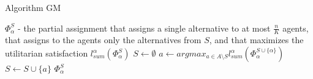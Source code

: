 \begin{algorithm}
\caption{Algorithm GM}\label{euclid}
\begin{algorithmic}[1]
		\State $\Phi^{S}_{\alpha}$ - the partial assignment that assigns a single alternative to at most $\frac{n}{K}$ agents, that assigns to the agents only the alternatives from $S$, and that maximizes the utilitarian satisfaction $l^{\alpha}_{sum}(\Phi^{S}_{\alpha})$
		\State $S \gets \emptyset$
			\State $a \gets argmax_{a \in A \setminus S} l^{\alpha}_{sum} (\Phi^{S \cup \{\alpha\}}_{\alpha})$
			\State $S \gets S \cup \{a\}$
		\EndFor
		\State \Return $\Phi^{S}_{\alpha}$
	\EndProcedure
\end{algorithmic}
\end{algorithm}
